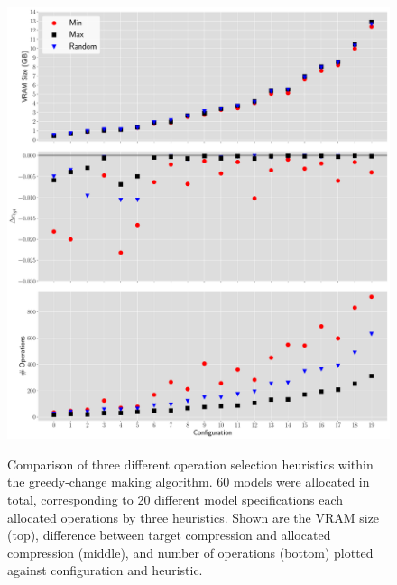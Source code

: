\begin{figure}[ht!]
    \centering
	\includegraphics[width=\linewidth]{binpacking} \\
	\caption[Comparison of three different operation selection heuristics within the greedy change-making algorithm]{Comparison of three different operation selection heuristics within the greedy-change making algorithm.
	60 models were allocated in total, corresponding to 20 different model specifications each allocated operations by three
	heuristics.	Shown are the VRAM size (top),  difference between target compression
	and allocated compression (middle), and number of operations (bottom) plotted against configuration and heuristic.}
	\label{fig:changemaking}
\end{figure}

